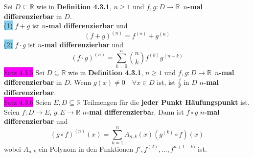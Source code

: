 \documentclass[landscape, 10pt]{article}
\newcommand{\R}{\mathbb{R}}
\begin{document}
\begin{multicols}{3}
                     Sei \textcolor{NavyBlue}{$D\subseteq\R$} 
                     wie in 
                     \textbf{Definition 4.3.1}, 
                     \textcolor{NavyBlue}{$n\geqslant1$} und 
                     \textcolor{NavyBlue}{
                     $f,g:D\longrightarrow\R$}\,
                     \textbf{$n$-mal 
                     differenzierbar} in 
                     \textcolor{NavyBlue}{$D$}.\\
                     \colorbox{SkyBlue}{(1)} 
                            \textcolor{NavyBlue}{$f+g$} 
                            ist $n$\textbf{-mal 
                            differenzierbar} und 
                            \begin{equation*}
                                   (f+g)^{(n)}=f^{(n)}+g^{(n)}
                            \end{equation*}
                     \colorbox{SkyBlue}{(2)} 
                            \textcolor{NavyBlue}{$f\cdot g$}
                            ist $n$\textbf{-mal differenzierbar} 
                            und 
                            \begin{equation*}
                                   (f\cdot g)^{(n)}
                                   =\sum_{k=0}^n
                                   \binom{n}{k}f^{(k)}g^{(n-k)}
                            \end{equation*}
              \colorbox{magenta}{Satz 4.3.5} 
                     Sei \textcolor{NavyBlue}{
                     $D\subseteq\R$} wie in 
                     \textbf{Definition 4.3.1}, 
                     \textcolor{NavyBlue}{$n\geqslant1$} und 
                     \textcolor{NavyBlue}{
                     $f,g:D\longrightarrow\R$}\,
                     \textbf{$n$-mal differenzierbar} in 
                     \textcolor{NavyBlue}{$D$}. Wenn 
                     \textcolor{NavyBlue}{
                     $g(x)\neq0\quad\forall x\in D$} ist, 
                     ist \textcolor{NavyBlue}{$\frac{f}{g}$} 
                     in \textcolor{NavyBlue}{$D$} 
                     $n$\textbf{-mal differenzierbar}. \\
              \colorbox{magenta}{Satz 4.3.6} 
                     Seien \textcolor{NavyBlue}{
                     $E,D\subseteq\R$} Teilmengen 
                     für die \textbf{jeder Punkt 
                     Häufungspunkt} ist. Seien 
                     \textcolor{NavyBlue}{$f:D\longrightarrow E$},
                     \textcolor{NavyBlue}{$g:E\longrightarrow\R$} 
                     \textbf{$n$-mal differenzierba}r.
                     Dann ist \textcolor{NavyBlue}{$f\circ g$} 
                     $n$\textbf{-mal differenzierbar} und 
                     \begin{equation*}
                            (g\circ f)^{(n)}(x)
                            =\sum_{k=1}^nA_{n,k}(x)
                            (g^{(k)}\circ f)(x)
                     \end{equation*}
                     wobei \textcolor{NavyBlue}{$A_{n,k}$} 
                     ein Polynom in den Funktionen 
                     \textcolor{NavyBlue}{
                     $f',f^{(2)},...,f^{n+1-k)}$} ist.

\end{multicols}
\end{document}
